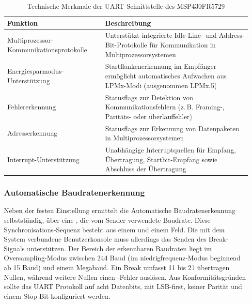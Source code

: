 \vspace{1cm}
\begin{table}[h!]
	\small
	\centering
	\begin{tabular}{|p{6.5cm}|p{7.5cm}|}
		\hline
		\textbf{Funktion} & \textbf{Beschreibung} \\
		\hline
		Multiprozessor-Kommunikationsprotokolle & Unterst\"utzt integrierte Idle-Line- und Address-Bit-Protokolle f\"ur Kommunikation in Multiprozessorsystemen \\
		\hline
		Energiesparmodus-Unterst\"utzung & Startflankenerkennung im Empf\"anger erm\"oglicht automatisches Aufwachen aus LPMx-Modi (ausgenommen LPMx.5) \\
		\hline
		Fehlererkennung & Statusflags zur Detektion von Kommunikationsfehlern (z.\,B. Framing-, Parit\"ats- oder \"uberlauffehler) \\
		\hline
		Adresserkennung & Statusflags zur Erkennung von Datenpaketen in Multiprozessorsystemen \\
		\hline
		Interrupt-Unterst\"utzung & Unabh\"angige Interruptquellen f\"ur Empfang, \"Ubertragung, Startbit-Empfang sowie Abschluss der \"Ubertragung \\
		\hline
	\end{tabular}
	\caption{Technische Merkmale der UART-Schnittstelle des MSP430FR5729\\}
	\label{tab:uart_features}
\end{table}

\subsubsection{Automatische Baudratenerkennung}
\label{sec:auto_baud}

Neben der festen Einstellung ermittelt die Automatische Baudratenerkennung selbstst\"andig, \"uber eine , die vom Sender verwendete Baudrate. Diese Synchronisations-Sequenz besteht aus einem  und einem  Feld. Die mit dem System verbundene Benutzerkonsole muss allerdings das Senden des Break-Signals unterst\"utzen. Der Bereich der erkennbaren Baudraten liegt im Oversampling-Modus zwischen 244 Baud (im niedrigfrequenz-Modus beginnend ab 15 Baud) und einem Megabaud. Ein Break umfasst 11 bis 21 \"ubertragen Nullen, w\"ahrend weitere Nullen einen -Fehler ausl\"osen. Aus Konformit\"atsgr\"unden sollte das UART Protokoll auf acht Datenbits, mit LSB-first, keiner Parit\"at und einem Stop-Bit konfiguriert werden. 

